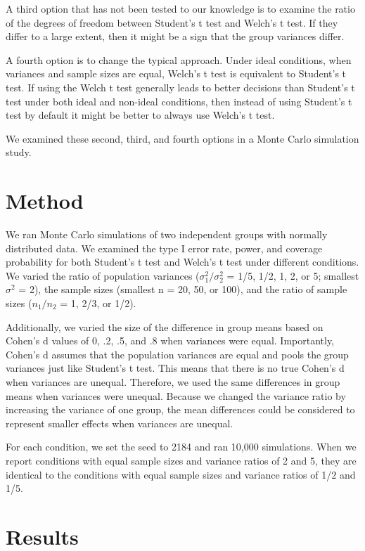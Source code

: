 \documentclass[man,a4paper,noextraspace,apacite]{apa6}
\begin{document}
    A third option that has not been tested to our knowledge is to examine the ratio of the degrees of freedom between Student's t test and Welch's t test. If they differ to a large extent, then it might be a sign that the group variances differ.

    A fourth option is to change the typical approach. Under ideal conditions, when variances and sample sizes are equal, Welch's t test is equivalent to Student's t test. If using the Welch t test generally leads to better decisions than Student's t test under both ideal and non-ideal conditions, then instead of using Student's t test by default it might be better to always use Welch's t test.
    
    We examined these second, third, and fourth options in a Monte Carlo simulation study. 
    
\section{Method}

    We ran Monte Carlo simulations of two independent groups with normally distributed data. We examined the type I error rate, power, and coverage probability for both Student's t test and Welch's t test under different conditions. We varied the ratio of population variances ($\sigma_{1}^2/\sigma_{2}^2$ = 1/5, 1/2, 1, 2, or 5; smallest $\sigma^2$ = 2), the sample sizes (smallest n = 20, 50, or 100), and the ratio of sample sizes ($n_{1}/n_{2}$ = 1, 2/3, or 1/2). 
    
    Additionally, we varied the size of the difference in group means based on Cohen's d values of 0, .2, .5, and .8 when variances were equal. Importantly, Cohen's d assumes that the population variances are equal and pools the group variances just like Student's t test. This means that there is no true Cohen's d when variances are unequal. Therefore, we used the same differences in group means when variances were unequal. Because we changed the variance ratio by increasing the variance of one group, the mean differences could be considered to represent smaller effects when variances are unequal.
    
    For each condition, we set the seed to 2184 and ran 10,000 simulations. When we report conditions with equal sample sizes and variance ratios of 2 and 5, they are identical to the conditions with equal sample sizes and variance ratios of 1/2 and 1/5. 

\section{Results}   
\end{document}
